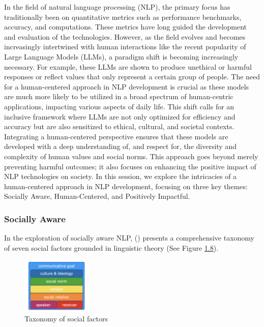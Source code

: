 \documentclass[
  letterpaper,
  DIV=11,
  numbers=noendperiod,
  oneside]{scrreprt}
\theoremstyle{remark}
\begin{document}
In the field of natural language processing (NLP), the primary focus has
traditionally been on quantitative metrics such as performance
benchmarks, accuracy, and computations. These metrics have long guided
the development and evaluation of the technologies. However, as the
field evolves and becomes increasingly intertwined with human
interactions like the recent popularity of Large Language Models (LLMs),
a paradigm shift is becoming increasingly necessary. For example, these
LLMs are shown to produce unethical or harmful responses or reflect
values that only represent a certain group of people. The need for a
human-centered approach in NLP development is crucial as these models
are much more likely to be utilized in a broad spectrum of human-centric
applications, impacting various aspects of daily life. This shift calls
for an inclusive framework where LLMs are not only optimized for
efficiency and accuracy but are also sensitized to ethical, cultural,
and societal contexts. Integrating a human-centered perspective ensures
that these models are developed with a deep understanding of, and
respect for, the diversity and complexity of human values and social
norms. This approach goes beyond merely preventing harmful outcomes; it
also focuses on enhancing the positive impact of NLP technologies on
society. In this session, we explore the intricacies of a human-centered
approach in NLP development, focusing on three key themes: Socially
Aware, Human-Centered, and Positively Impactful.

\subsubsection{Socially Aware}\label{socially-aware}

In the exploration of socially aware NLP,
() presents
a comprehensive taxonomy of seven social factors grounded in linguistic
theory (See Figure \hyperref[fig:taxonomy]{1.8}).

\begin{figure}

{\centering \includegraphics[width=0.3\textwidth,height=\textheight]{src/Figures/seven-taxonomy.png}

}

\caption{Taxonomy of social factors}

\end{figure}%
\end{document}
